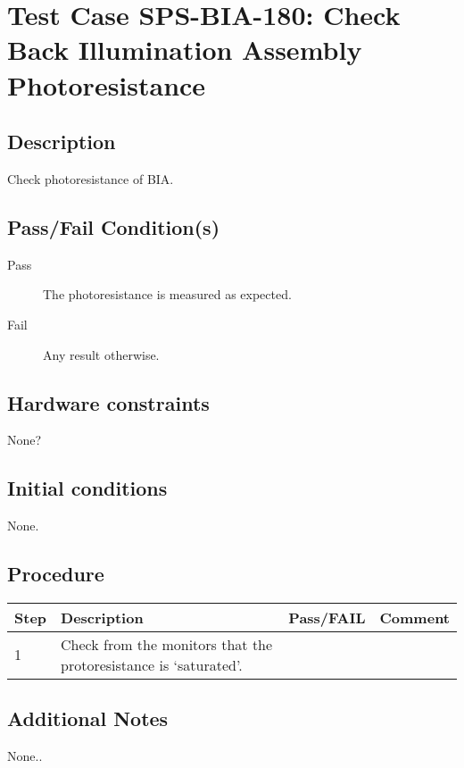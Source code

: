 \section{Test Case SPS-BIA-180: Check Back Illumination Assembly Photoresistance}

\subsection{Description}

Check photoresistance of BIA.

\subsection{Pass/Fail Condition(s)}

\begin{description}
\item [Pass] The photoresistance is measured as expected.
\item [Fail] Any result otherwise. 
\end{description}

\subsection{Hardware constraints}

None?

\subsection{Initial conditions}

None.

\subsection{Procedure}

\begin{table}[H]
    \begin{tabular}{|l| p{5cm} |l| p{5cm} |}
    \hline
    {\bf Step} & {\bf Description} & {\bf Pass/FAIL} & {\bf Comment}  \\ \hline
    1 & Check from the monitors that the protoresistance is `saturated'. &  &  \\ \hline
    \end{tabular}
\end{table}

\subsection{Additional Notes}

None..

